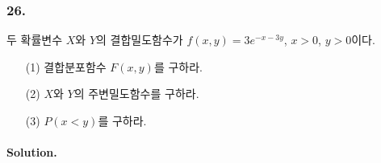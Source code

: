 \subsubsection{26.} 두 확률변수 $X$와 $Y$의 결합밀도함수가 $f\left(x, y\right) = 3e^{-x-3y}$, $x>0$, $y>0$이다.
\begin{itemize}
  \item [(1)] 결합분포함수 $F\left(x, y\right)$를 구하라.
  \item [(2)] $X$와 $Y$의 주변밀도함수를 구하라.
  \item [(3)] $P\left(x<y\right)$를 구하라.
\end{itemize}

\paragraph{Solution.} 
